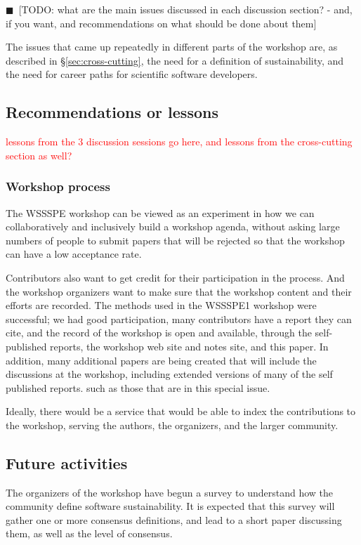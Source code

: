 \documentclass[11pt, oneside]{amsart}
\newcommand{\todo}[1]{{\color{blue}$\blacksquare$~\textsf{[TODO: #1]}}}
\newcommand{\note}[1]{ {\textcolor{red}    { #1 }}}
\begin{document}
\todo{what are the main issues discussed in each discussion section? - and, if you want, and recommendations on what should be done about them}

The issues that came up repeatedly in different parts of the workshop are, as described in
\S\ref{sec:cross-cutting}, the need for a definition of sustainability, and the need for
career paths for scientific software developers.

\subsection{Recommendations or lessons}

\note{lessons from the 3 discussion sessions go here, and lessons from the cross-cutting section as well?}

\subsubsection*{Workshop process}

The WSSSPE workshop can be viewed as an experiment in how we can
collaboratively and inclusively build a workshop agenda, without asking
large numbers of people to submit papers that will be rejected so that the
workshop can have a low acceptance rate.

Contributors also want to get credit for their participation in the process.
And the workshop organizers want to make sure that the workshop content and
their efforts are recorded.  The methods used in the WSSSPE1 workshop
were successful; we had good participation, many contributors have a
report they can cite, and the record of the workshop is open and available,
through the self-published reports, the workshop web site and notes site,
and this paper.  In addition, many additional papers are being created that
will include the discussions at the workshop, including extended versions
of many of the self published reports. such as those that are in this
special issue.

Ideally, there would be a service that
would be able to index the contributions to the workshop, serving the
authors, the organizers, and the larger community. 

\subsection{Future activities}

The organizers of the workshop have begun a survey to understand how
the community define software sustainability.  It is expected that this survey
will gather one or more consensus definitions, and lead to a short paper
discussing them, as well as the level of consensus.
\end{document}
